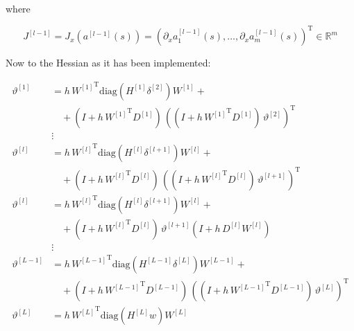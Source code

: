 where 

\begin{equation*}
    J^{[l-1]} = J_x(a^{[l-1]}(s)) = \left( \partial_x a^{[l-1]}_1(s), \ldots, \partial_x a^{[l-1]}_m(s) \right)^{\mathrm{T}} \in \mathbb{R}^{m}
\end{equation*}


Now to the Hessian as it has been implemented: 

\begin{align*}
    \vartheta^{[1]} & = h \, {W^{[1]}}^{\mathrm{T}} \mathrm{diag} \left( H^{[1]} \delta^{[2]} \right) W^{[1]} + \\
    & \quad + \left( I + h \, {W^{[1]}}^{\mathrm{T}} D^{[1]} \right) \, \left( \left( I + h \, {W^{[1]}}^{\mathrm{T}} D^{[1]} \right) \, \vartheta^{[2]} \right)^{\mathrm{T}} \\ 
    &\vdots\\
    \vartheta^{[l]} & = h \, {W^{[l]}}^{\mathrm{T}} \mathrm{diag} \left( H^{[l]} \delta^{[l+1]} \right) W^{[l]} + \\
    & \quad + \left( I + h \, {W^{[l]}}^{\mathrm{T}} D^{[l]} \right) \, \left( \left( I + h \, {W^{[l]}}^{\mathrm{T}} D^{[l]} \right) \, \vartheta^{[l+1]} \right)^{\mathrm{T}} \\ 
    \vartheta^{[l]} & = h \, {W^{[l]}}^{\mathrm{T}} \mathrm{diag} \left( H^{[l]} \delta^{[l+1]} \right) W^{[l]} + \\
    & \quad + \left( I + h \, {W^{[l]}}^{\mathrm{T}} D^{[l]} \right) \, \vartheta^{[l+1]}  \left( I + h \,  D^{[l]} {W^{[l]}} \right) \\ 
    &\vdots\\
    \vartheta^{[L-1]} & = h \, {W^{[L-1]}}^{\mathrm{T}} \mathrm{diag} \left( H^{[L-1]} \delta^{[L]} \right) W^{[L-1]} + \\
    & \quad + \left( I + h \, {W^{[L-1]}}^{\mathrm{T}} D^{[L-1]} \right) \, \left( \left( I + h \, {W^{[L-1]}}^{\mathrm{T}} D^{[L-1]} \right) \, \vartheta^{[L]} \right)^{\mathrm{T}} \\
    \vartheta^{[L]} &  = h \, {W^{[L]}}^{\mathrm{T}} \mathrm{diag}(H^{[L]} w) W^{[L]} 
\end{align*}

